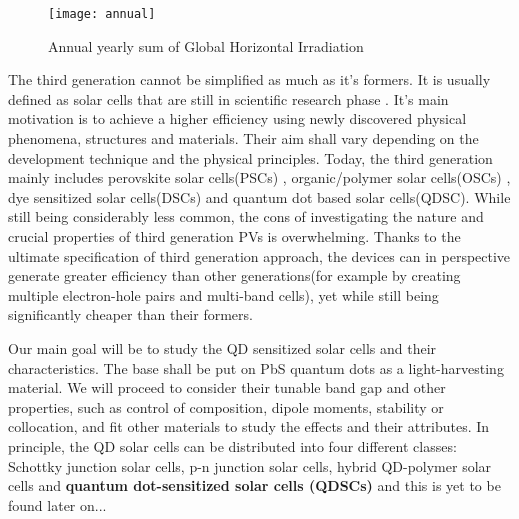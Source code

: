 \begin{figure}[ht]
\label{fig:annual} 
\centering
\texttt{[image: annual]}
\caption{Annual yearly sum of Global Horizontal Irradiation
\cite{1991-2010}}
\end{figure}

The third generation cannot be simplified as much as it's formers. It is usually defined as solar cells that are still in scientific research phase\cite{HuashangRao2018} \cite{GavinCon}. It's main motivation is to achieve a higher efficiency using newly discovered physical phenomena, structures and materials. Their aim shall vary depending on the development technique and the physical principles. Today, the third generation mainly includes perovskite solar cells(PSCs) \cite{PerovRev} \cite{revPerold}, organic/polymer solar cells(OSCs) \cite{Polymer}, dye sensitized solar cells(DSCs)\cite{DyeSent} and quantum dot based solar cells(QDSC). \cite{Kamat2018} While still being considerably less common, the cons of investigating the nature and crucial properties of third generation PVs is overwhelming. Thanks to the ultimate specification of third generation approach, the devices can in perspective generate greater efficiency than other generations(for example by creating multiple electron-hole pairs and multi-band cells), yet while still being significantly cheaper than their formers.

\vline

Our main goal will be to study the QD sensitized solar cells and their characteristics. The base shall be put on PbS quantum dots as a light-harvesting material. We will proceed to consider their tunable band gap and other properties, such as control of composition, dipole moments, stability or collocation, and fit other materials to study the effects and their attributes. In principle, the QD solar cells can be distributed into four different classes: Schottky junction solar cells, p-n junction solar cells, hybrid QD-polymer solar cells and \textbf{quantum dot-sensitized solar cells (QDSCs)} and this is yet to be found later on...